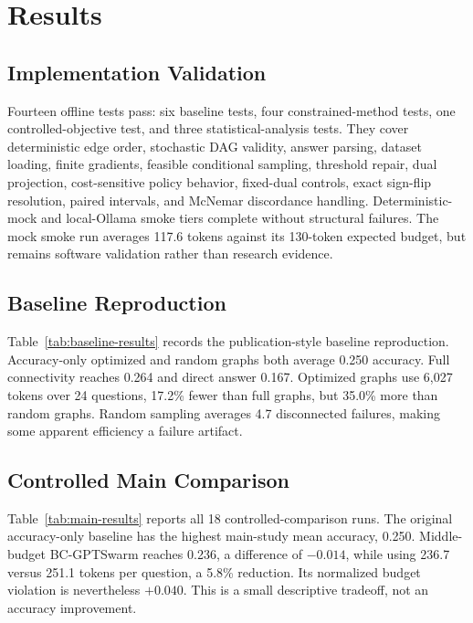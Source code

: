 \section{Results}

\subsection{Implementation Validation}

Fourteen offline tests pass: six baseline tests, four constrained-method tests, one controlled-objective test, and three statistical-analysis tests. They cover deterministic edge order, stochastic DAG validity, answer parsing, dataset loading, finite gradients, feasible conditional sampling, threshold repair, dual projection, cost-sensitive policy behavior, fixed-dual controls, exact sign-flip resolution, paired intervals, and McNemar discordance handling. Deterministic-mock and local-Ollama smoke tiers complete without structural failures. The mock smoke run averages 117.6 tokens against its 130-token expected budget, but remains software validation rather than research evidence.

\subsection{Baseline Reproduction}



Table~\ref{tab:baseline-results} records the publication-style baseline reproduction. Accuracy-only optimized and random graphs both average 0.250 accuracy. Full connectivity reaches 0.264 and direct answer 0.167. Optimized graphs use 6,027 tokens over 24 questions, 17.2\% fewer than full graphs, but 35.0\% more than random graphs. Random sampling averages 4.7 disconnected failures, making some apparent efficiency a failure artifact.

\subsection{Controlled Main Comparison}



Table~\ref{tab:main-results} reports all 18 controlled-comparison runs. The original accuracy-only baseline has the highest main-study mean accuracy, 0.250. Middle-budget BC-GPTSwarm reaches 0.236, a difference of $-0.014$, while using 236.7 versus 251.1 tokens per question, a 5.8\% reduction. Its normalized budget violation is nevertheless $+0.040$. This is a small descriptive tradeoff, not an accuracy improvement.

